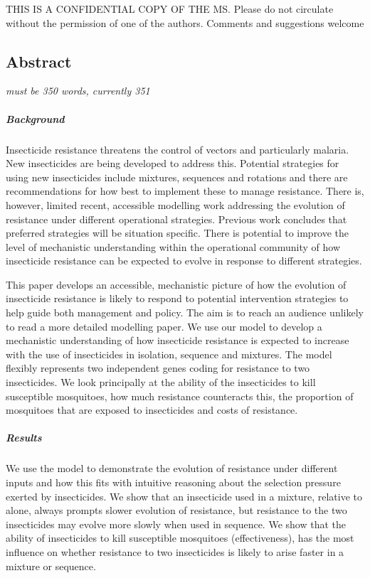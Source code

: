 \documentclass[11pt,]{article}
\let\oldsubparagraph\subparagraph
\renewcommand{\subparagraph}[1]{\oldsubparagraph{#1}\mbox{}}
\begin{document}
THIS IS A CONFIDENTIAL COPY OF THE MS. Please do not circulate without
the permission of one of the authors. Comments and suggestions welcome

\subsection{Abstract}\label{abstract}

\emph{must be 350 words, currently 351}

\subparagraph{Background}\label{background}

Insecticide resistance threatens the control of vectors and particularly
malaria. New insecticides are being developed to address this. Potential
strategies for using new insecticides include mixtures, sequences and
rotations and there are recommendations for how best to implement these
to manage resistance. There is, however, limited recent, accessible
modelling work addressing the evolution of resistance under different
operational strategies. Previous work concludes that preferred
strategies will be situation specific. There is potential to improve the
level of mechanistic understanding within the operational community of
how insecticide resistance can be expected to evolve in response to
different strategies.

This paper develops an accessible, mechanistic picture of how the
evolution of insecticide resistance is likely to respond to potential
intervention strategies to help guide both management and policy. The
aim is to reach an audience unlikely to read a more detailed modelling
paper. We use our model to develop a mechanistic understanding of how
insecticide resistance is expected to increase with the use of
insecticides in isolation, sequence and mixtures. The model flexibly
represents two independent genes coding for resistance to two
insecticides. We look principally at the ability of the insecticides to
kill susceptible mosquitoes, how much resistance counteracts this, the
proportion of mosquitoes that are exposed to insecticides and costs of
resistance.

\subparagraph{Results}\label{results}

We use the model to demonstrate the evolution of resistance under
different inputs and how this fits with intuitive reasoning about the
selection pressure exerted by insecticides. We show that an insecticide
used in a mixture, relative to alone, always prompts slower evolution of
resistance, but resistance to the two insecticides may evolve more
slowly when used in sequence. We show that the ability of insecticides
to kill susceptible mosquitoes (effectiveness), has the most influence
on whether resistance to two insecticides is likely to arise faster in a
mixture or sequence.
\end{document}
